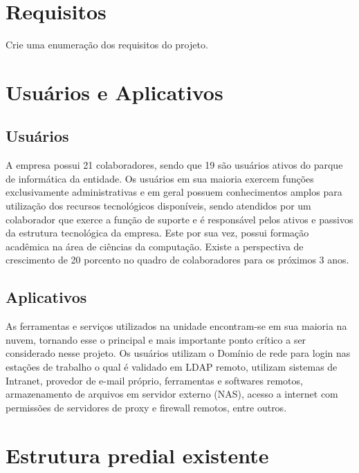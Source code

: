 \documentclass[	DIV=calc,%
							paper=a4,%
							fontsize=12pt,%
							onecolumn]{scrartcl}	 					%
\begin{document}
\section{Requisitos}
Crie uma enumeração dos requisitos do projeto.

\section{Usuários e Aplicativos}

\subsection{Usuários}
A empresa possui 21 colaboradores, sendo que 19 são usuários ativos do parque de informática da entidade.
Os usuários em sua maioria exercem funções exclusivamente administrativas e em geral possuem conhecimentos amplos para utilização dos recursos tecnológicos disponíveis, sendo atendidos por um colaborador que exerce a função de suporte e é responsável pelos ativos e passivos da estrutura tecnológica da empresa. Este por sua vez, possui formação acadêmica na área de ciências da computação.
Existe a perspectiva de crescimento de 20 porcento no quadro de colaboradores para os próximos 3 anos.

\subsection{Aplicativos}
As ferramentas e serviços utilizados na unidade encontram-se em sua maioria na nuvem, tornando esse o principal e mais importante ponto crítico a ser considerado nesse projeto. Os usuários utilizam o Domínio de rede para login nas estações de trabalho o qual é validado em LDAP remoto, utilizam sistemas de Intranet, provedor de e-mail próprio, ferramentas e softwares remotos, armazenamento de arquivos em servidor externo (NAS), acesso a internet com permissões de servidores de proxy e firewall remotos, entre outros.


\section{Estrutura predial existente}


\clearpage
{}
\recalctypearea
\end{document}
